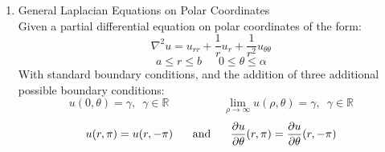 \documentclass{article}
\begin{document}
\begin{enumerate}
    \pagebreak
        
        
    
    
    \item General Laplacian Equations on Polar Coordinates
    \medskip\\
    Given a partial differential equation on polar coordinates of the form:
    \[
        \nabla^2 u = u_{rr} + \frac{1}{r}u_r + \frac{1}{r^2}u_{\theta \theta}
    \]
    \[
        a \leq r \leq b \,\,\,\,\,\,\,\,\, 0 \leq \theta \leq \alpha
    \]
    With standard boundary conditions, and the addition of three additional possible boundary conditions:
    \[
        u(0,\theta) = \gamma, \,\,\, \gamma \in \mathbb{R} \hspace{2cm} \lim_{\rho \to \infty}u(\rho, \theta) = \gamma, \,\,\, \gamma \in \mathbb{R}
    \]
    \[
        u(r,\pi) = u(r,-\pi) \hspace{0.5cm} \textrm{ and } \hspace{0.5cm} \frac{\partial u}{\partial \theta}(r, \pi) = \frac{\partial u}{\partial \theta}(r, -\pi)
    \]
    

\end{enumerate}
\end{document}

